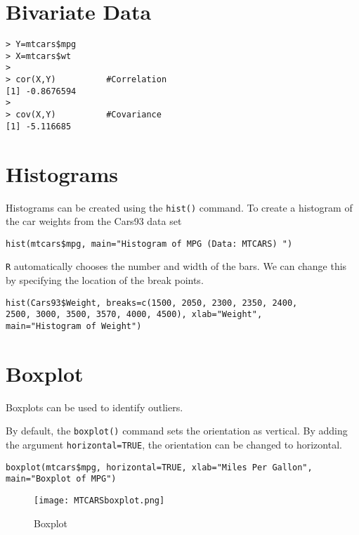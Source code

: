 


\section{Bivariate Data}
\footnotesize \begin{myindentpar}{1cm}
\begin{verbatim}
> Y=mtcars$mpg
> X=mtcars$wt
>
> cor(X,Y)          #Correlation
[1] -0.8676594
>
> cov(X,Y)          #Covariance
[1] -5.116685
\end{verbatim}
\end{myindentpar}\normalsize


\section{Histograms}
Histograms can be created using the \texttt{hist()} command.
To create a histogram of the car weights from the Cars93 data set
\footnotesize
\begin{myindentpar}{1cm}
\begin{verbatim}
hist(mtcars$mpg, main="Histogram of MPG (Data: MTCARS) ")
\end{verbatim}
\end{myindentpar}\normalsize
\texttt{R} automatically chooses the number and width of the bars. We can
change this by specifying the location of the break points.
\footnotesize
\begin{myindentpar}{1cm}
\begin{verbatim}hist(Cars93$Weight, breaks=c(1500, 2050, 2300, 2350, 2400,
2500, 3000, 3500, 3570, 4000, 4500), xlab="Weight",
main="Histogram of Weight")
\end{verbatim}
\end{myindentpar}\normalsize



\section{Boxplot}
Boxplots can be used to identify outliers.

By default, the \texttt{boxplot()} command sets the orientation as vertical. By adding the argument \texttt{horizontal=TRUE}, the orientation can be changed to horizontal.
\footnotesize
\begin{myindentpar}{1cm}
\begin{verbatim}
boxplot(mtcars$mpg, horizontal=TRUE, xlab="Miles Per Gallon",
main="Boxplot of MPG")
\end{verbatim}
\end{myindentpar}\normalsize

\begin{figure}
  \texttt{[image: MTCARSboxplot.png]}\\
  \caption{Boxplot}\label{boxplot}
\end{figure}

